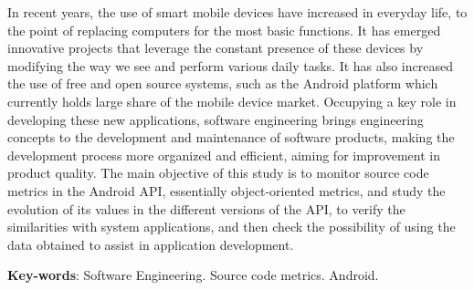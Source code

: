 \begin{resumo}[Abstract]
  
In recent years, the use of smart mobile devices have increased in everyday life, to the point of replacing computers for the most basic functions. It has emerged innovative projects that leverage the constant presence of these devices by modifying the way we see and perform various daily tasks. It has also increased the use of free and open source systems, such as the Android platform which currently holds large share of the mobile device market. Occupying a key role in developing these new applications, software engineering brings engineering concepts to the development and maintenance of software products, making the development process more organized and efficient, aiming for improvement in product quality. The main objective of this study is to monitor source code metrics in the Android API, essentially object-oriented metrics, and study the evolution of its values in the different versions of the API, to verify the similarities with system applications, and then check the possibility of using the data obtained to assist in application development.
   \vspace{\onelineskip}
 
  \noindent 
  \textbf{Key-words}: Software Engineering. Source code metrics. Android.
\end{resumo}
